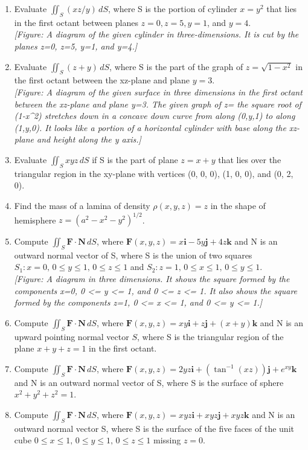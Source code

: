 \documentclass{exercises}
\begin{document}
\begin{enumerate}[resume]
\item \techrequired Evaluate $\iint_{S}(xz/y)\,dS$, where S is the portion of cylinder $x=y^{2}$ that lies in the first octant between planes $z=0,z=5,y=1$, and $y=4$. \\ \textit{[Figure: A diagram of the given cylinder in three-dimensions. It is cut by the planes z=0, z=5, y=1, and y=4.]}
\item \techrequired Evaluate $\iint_{S}(z+y)\,dS$, where S is the part of the graph of $z=\sqrt{1-x^{2}}$ in the first octant between the xz-plane and plane $y=3$. \\ \textit{[Figure: A diagram of the given surface in three dimensions in the first octant between the xz-plane and plane y=3. The given graph of z= the square root of (1-x\textasciicircum{}2) stretches down in a concave down curve from along (0,y,1) to along (1,y,0). It looks like a portion of a horizontal cylinder with base along the xz-plane and height along the y axis.]}
\item Evaluate $\iint_{S}xyz\,dS$ if S is the part of plane $z=x+y$ that lies over the triangular region in the xy-plane with vertices (0, 0, 0), (1, 0, 0), and (0, 2, 0).
\item Find the mass of a lamina of density $\rho(x,y,z)=z$ in the shape of hemisphere $z={(a^{2}-x^{2}-y^{2})}^{1/2}$.
\item Compute $\iint_{S}\mathbf{F}\cdot \mathbf{N}\,dS$, where $\mathbf{F}(x,y,z)=x\mathbf{i}-5y\mathbf{j}+4z\mathbf{k}$ and N is an outward normal vector of S, where S is the union of two squares $S_{1}:x=0,\,0\le y\le1,\,0\le z\le1$ and $S_{2}:z=1,\,0\le x\le1,\,0\le y\le1$. \\ \textit{[Figure: A diagram in three dimensions. It shows the square formed by the components x=0, 0 <= y <= 1, and 0 <= z <= 1. It also shows the square formed by the components z=1, 0 <= x <= 1, and 0 <= y <= 1.]}
\item Compute $\iint_{S}\mathbf{F}\cdot \mathbf{N}\,dS$, where $\mathbf{F}(x,y,z)=xy\mathbf{i}+z\mathbf{j}+(x+y)\mathbf{k}$ and N is an upward pointing normal vector $S$, where S is the triangular region of the plane $x+y+z=1$ in the first octant.
\item Compute $\iint_{S}\mathbf{F}\cdot \mathbf{N}\,dS$, where $\mathbf{F}(x,y,z)=2yz\mathbf{i}+(\tan^{-1}(xz))\mathbf{j}+e^{xy}\mathbf{k}$ and N is an outward normal vector of S, where S is the surface of sphere $x^{2}+y^{2}+z^{2}=1$.
\item Compute $\iint_{S}\mathbf{F}\cdot \mathbf{N}\,dS$, where $\mathbf{F}(x,y,z)=xyz\mathbf{i}+xyz\mathbf{j}+xyz\mathbf{k}$ and N is an outward normal vector S, where S is the surface of the five faces of the unit cube $0\le x\le1,\,0\le y\le1,\,0\le z\le1$ missing $z=0$.
\end{enumerate}
\end{document}
